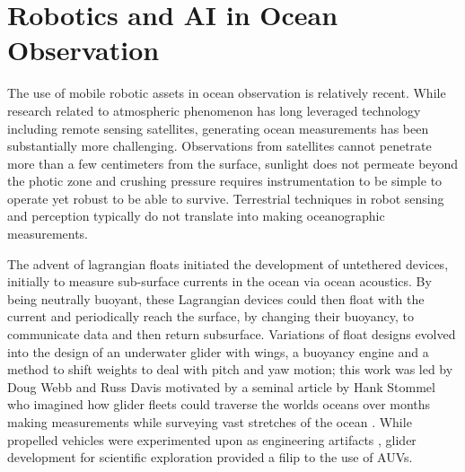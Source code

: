 \section{Robotics and AI in Ocean Observation}

The use of mobile robotic assets in ocean observation is relatively
recent. While research related to atmospheric phenomenon has long
leveraged technology including remote sensing satellites, generating
ocean measurements has been substantially more
challenging. Observations from satellites cannot penetrate more than a
few centimeters from the surface, sunlight does not permeate beyond
the photic zone and crushing pressure requires instrumentation to be
simple to operate yet robust to be able to survive. Terrestrial
techniques in robot sensing and perception typically do not translate
into making oceanographic measurements. 

The advent of lagrangian floats initiated the development of
untethered devices, initially to measure sub-surface currents in the
ocean via ocean acoustics. By being neutrally buoyant, these
Lagrangian devices could then float with the current and periodically
reach the surface, by changing their buoyancy, to communicate data and
then return subsurface. Variations of float designs evolved into the
design of an underwater glider with wings, a buoyancy engine and a
method to shift weights to deal with pitch and yaw motion; this work
was led by Doug Webb and Russ Davis \cite{davis02} motivated by a
seminal article by Hank Stommel who imagined how glider fleets could
traverse the worlds oceans over months making measurements while
surveying vast stretches of the ocean \cite{stomme89}. While propelled
vehicles were experimented upon as engineering artifacts
\cite{blidberg01}, glider development for scientific exploration
provided a filip to the use of AUVs.

